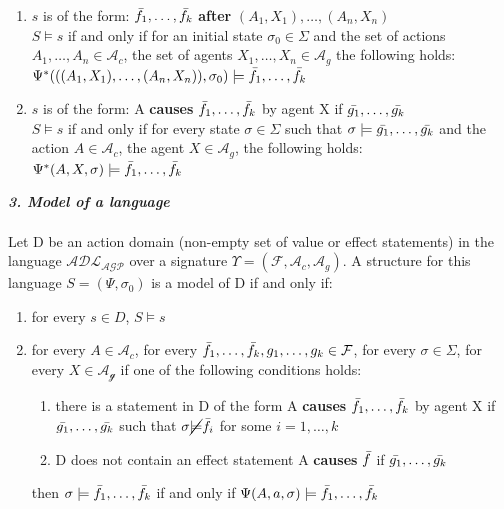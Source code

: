 \documentclass[a4paper]{article}
\begin{document}
\begin{enumerate}
    \item $s$ is of the form: $\Bar{f_1},\dotsc,\Bar{f_k}$ \textbf{after} $(A_1, X_1),\dotsc,(A_n, X_n)$ \\[0.5\baselineskip]
      $S\models s$ if and only if for an initial state $\sigma_0\in\Sigma$ and the set of actions $A_1,\dotsc,A_n\in\mathcal{A}_c$, the set of agents $X_1,\dotsc,X_n\in\mathcal{A}_g$ the following holds: 
    $\Psi^\ast(((A_1,X_1),\dotsc,(A_n,X_n)),\sigma_0)\models\Bar{f_1},\dotsc,\Bar{f_k}$
    \item $s$ is of the form: A \textbf{causes} $\Bar{f_1},\dotsc,\Bar{f_k}$  by agent X if $\Bar{g_1},\dotsc,\Bar{g_k}$   \\[0.5\baselineskip]
    $S\models s$ if and only if for every state $\sigma\in\Sigma$ such that $\sigma\models\Bar{g_1},\dotsc,\Bar{g_k}$ and the action $A\in\mathcal{A}_c$, the agent $X\in\mathcal{A}_g$, the following holds: 
    $\Psi^\ast(A, X,\sigma)\models\Bar{f_1},\dotsc,\Bar{f_k}$ 
\end{enumerate}
\textbf{\textit{3. Model of a language}}
\\ \\
Let D be an action domain (non-empty set of value or effect statements) in the language $\mathcal{ADL_{AGP}}$ over a signature $\Upsilon = (\mathcal{F}, \mathcal{A}_c, \mathcal{A}_g)$. 
A structure for this language $S=(\Psi,\sigma_0)$ is a model of D if and only if:
\begin{enumerate}
    \item for every $s \in D$, $S \models s$
    \item for every $A\in\mathcal{A}_c$, for every $\Bar{f_1},\dotsc,\Bar{f_k},g_1,\dotsc,g_k\in\mathcal{F}$, for every $\sigma\in\Sigma$, for every $X\in\mathcal{A_g}$ if one of the following conditions holds:
    \begin{enumerate}[label=(\alph*)]
      \item there is a statement in D of the form A \textbf{causes} $\Bar{f_1},\dotsc,\Bar{f_k}$ by agent X if $\Bar{g_1},\dotsc,\Bar{g_k}$ such that $\sigma \cancel{\models} \Bar{f_i}$ for some $i = 1,\dotsc,k$
        \item D does not contain an effect statement A \textbf{causes} $\Bar{f}$ if $\Bar{g_1},\dotsc,\Bar{g_k}$ 
    \end{enumerate}
    then $\sigma\models \Bar{f_1},\dotsc,\Bar{f_k}$ if and only if $\Psi(A,a,\sigma) \models \Bar{f_1},\dotsc,\Bar{f_k}$
\end{enumerate}
%
\end{document}
